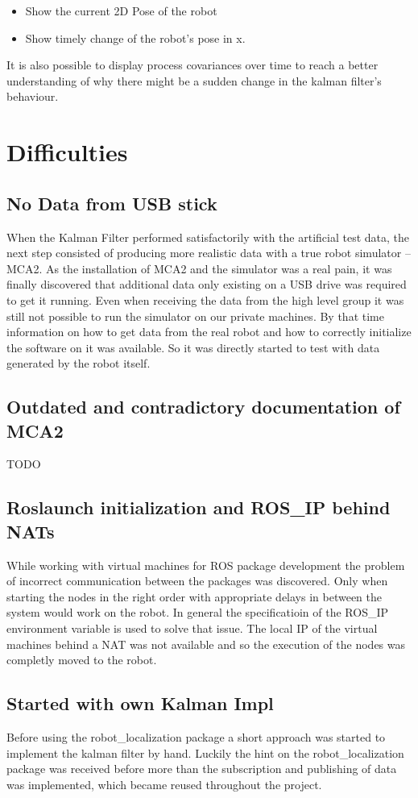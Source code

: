 \begin{itemize}
\item Show the current 2D Pose of the robot
\item Show timely change of the robot's pose in x.
\end{itemize}

It is also possible to display process covariances over time to reach a better understanding of why there might be a sudden change in the kalman filter's behaviour.

\section{Difficulties}
\subsection{No Data from USB stick}
When the Kalman Filter performed satisfactorily with the artificial test data, the next step consisted of producing more realistic data with a true robot simulator -- MCA2. As the installation of MCA2 and the simulator was a real pain, it was finally discovered that additional data only existing on a USB drive was required to get it running. Even when receiving the data from the high level group it was still not possible to run the simulator on our private machines. By that time information on how to get data from the real robot and how to correctly initialize the software on it was available. So it was directly started to test with data generated by the robot itself.

\subsection{Outdated and contradictory documentation of MCA2}
TODO
\subsection{Roslaunch initialization and ROS\_IP behind NATs}
While working with virtual machines for ROS package development the problem of incorrect communication between the packages was discovered. Only when starting the nodes in the right order with appropriate delays in between the system would work on the robot. In general the specificatioin of the ROS\_IP environment variable is used to solve that issue. The local IP of the virtual machines behind a NAT was not available and so the execution of the nodes was completly moved to the robot.
\subsection{Started with own Kalman Impl}
Before using the robot\_localization package a short approach was started to implement the kalman filter by hand. Luckily the hint on the robot\_localization package was received before more than the subscription and publishing of data was implemented, which became reused throughout the project.
